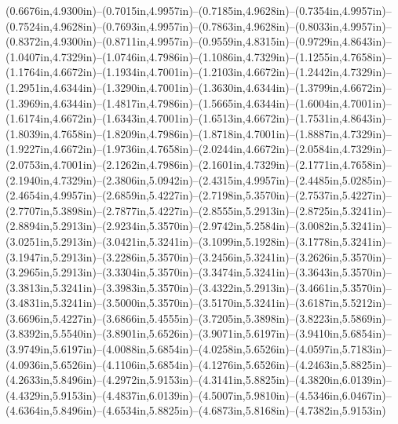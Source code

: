 (0.6676in,4.9300in)--(0.7015in,4.9957in)--(0.7185in,4.9628in)--(0.7354in,4.9957in)--(0.7524in,4.9628in)--(0.7693in,4.9957in)--(0.7863in,4.9628in)--(0.8033in,4.9957in)--(0.8372in,4.9300in)--(0.8711in,4.9957in)--(0.9559in,4.8315in)--(0.9729in,4.8643in)--(1.0407in,4.7329in)--(1.0746in,4.7986in)--(1.1086in,4.7329in)--(1.1255in,4.7658in)--(1.1764in,4.6672in)--(1.1934in,4.7001in)--(1.2103in,4.6672in)--(1.2442in,4.7329in)--(1.2951in,4.6344in)--(1.3290in,4.7001in)--(1.3630in,4.6344in)--(1.3799in,4.6672in)--(1.3969in,4.6344in)--(1.4817in,4.7986in)--(1.5665in,4.6344in)--(1.6004in,4.7001in)--(1.6174in,4.6672in)--(1.6343in,4.7001in)--(1.6513in,4.6672in)--(1.7531in,4.8643in)--(1.8039in,4.7658in)--(1.8209in,4.7986in)--(1.8718in,4.7001in)--(1.8887in,4.7329in)--(1.9227in,4.6672in)--(1.9736in,4.7658in)--(2.0244in,4.6672in)--(2.0584in,4.7329in)--(2.0753in,4.7001in)--(2.1262in,4.7986in)--(2.1601in,4.7329in)--(2.1771in,4.7658in)--(2.1940in,4.7329in)--(2.3806in,5.0942in)--(2.4315in,4.9957in)--(2.4485in,5.0285in)--(2.4654in,4.9957in)--(2.6859in,5.4227in)--(2.7198in,5.3570in)--(2.7537in,5.4227in)--(2.7707in,5.3898in)--(2.7877in,5.4227in)--(2.8555in,5.2913in)--(2.8725in,5.3241in)--(2.8894in,5.2913in)--(2.9234in,5.3570in)--(2.9742in,5.2584in)--(3.0082in,5.3241in)--(3.0251in,5.2913in)--(3.0421in,5.3241in)--(3.1099in,5.1928in)--(3.1778in,5.3241in)--(3.1947in,5.2913in)--(3.2286in,5.3570in)--(3.2456in,5.3241in)--(3.2626in,5.3570in)--(3.2965in,5.2913in)--(3.3304in,5.3570in)--(3.3474in,5.3241in)--(3.3643in,5.3570in)--(3.3813in,5.3241in)--(3.3983in,5.3570in)--(3.4322in,5.2913in)--(3.4661in,5.3570in)--(3.4831in,5.3241in)--(3.5000in,5.3570in)--(3.5170in,5.3241in)--(3.6187in,5.5212in)--(3.6696in,5.4227in)--(3.6866in,5.4555in)--(3.7205in,5.3898in)--(3.8223in,5.5869in)--(3.8392in,5.5540in)--(3.8901in,5.6526in)--(3.9071in,5.6197in)--(3.9410in,5.6854in)--(3.9749in,5.6197in)--(4.0088in,5.6854in)--(4.0258in,5.6526in)--(4.0597in,5.7183in)--(4.0936in,5.6526in)--(4.1106in,5.6854in)--(4.1276in,5.6526in)--(4.2463in,5.8825in)--(4.2633in,5.8496in)--(4.2972in,5.9153in)--(4.3141in,5.8825in)--(4.3820in,6.0139in)--(4.4329in,5.9153in)--(4.4837in,6.0139in)--(4.5007in,5.9810in)--(4.5346in,6.0467in)--(4.6364in,5.8496in)--(4.6534in,5.8825in)--(4.6873in,5.8168in)--(4.7382in,5.9153in) 